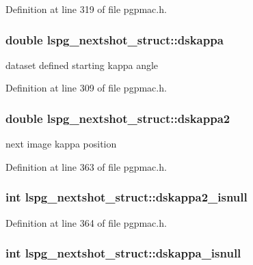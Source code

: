 Definition at line 319 of file pgpmac.\-h.

\hypertarget{structlspg__nextshot__struct_a59355281e8eb935cd7bfac597fdc5289}{
\subsubsection[{dskappa}]{\setlength{\rightskip}{0pt plus 5cm}double lspg\-\_\-nextshot\-\_\-struct\-::dskappa}}\label{structlspg__nextshot__struct_a59355281e8eb935cd7bfac597fdc5289}


dataset defined starting kappa angle 



Definition at line 309 of file pgpmac.\-h.

\hypertarget{structlspg__nextshot__struct_a8571a0b95fb6ea6356fd7204b9c9e371}{
\subsubsection[{dskappa2}]{\setlength{\rightskip}{0pt plus 5cm}double lspg\-\_\-nextshot\-\_\-struct\-::dskappa2}}\label{structlspg__nextshot__struct_a8571a0b95fb6ea6356fd7204b9c9e371}


next image kappa position 



Definition at line 363 of file pgpmac.\-h.

\hypertarget{structlspg__nextshot__struct_a9a7e47372f4f6e0e48a0cb3c78fa8437}{
\subsubsection[{dskappa2\-\_\-isnull}]{\setlength{\rightskip}{0pt plus 5cm}int lspg\-\_\-nextshot\-\_\-struct\-::dskappa2\-\_\-isnull}}\label{structlspg__nextshot__struct_a9a7e47372f4f6e0e48a0cb3c78fa8437}


Definition at line 364 of file pgpmac.\-h.

\hypertarget{structlspg__nextshot__struct_a1686a72509cc1c3383ee95a790ddff14}{
\subsubsection[{dskappa\-\_\-isnull}]{\setlength{\rightskip}{0pt plus 5cm}int lspg\-\_\-nextshot\-\_\-struct\-::dskappa\-\_\-isnull}}\label{structlspg__nextshot__struct_a1686a72509cc1c3383ee95a790ddff14}


